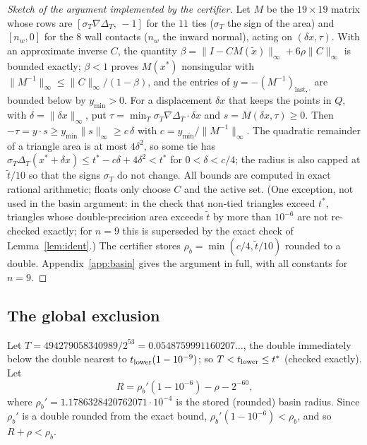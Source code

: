 \documentclass[11pt]{amsart}
\theoremstyle{definition}
\newcommand{\tstar}{t^{*}}
\begin{document}
\begin{proof}[Sketch of the argument implemented by the certifier]
Let $M$ be the $19\times19$ matrix whose rows are $[\sigma_T\nabla\Delta_T,\,-1]$ for the $11$ ties ($\sigma_T$ the sign of the area) and $[n_w, 0]$ for the $8$ wall contacts ($n_w$ the inward normal), acting on $(\delta x, \tau)$. With an approximate inverse $C$, the quantity $\beta = \|I - CM(\tilde x)\|_\infty + 6\rho\|C\|_\infty$ is bounded exactly; $\beta < 1$ proves $M(x^*)$ nonsingular with $\|M^{-1}\|_\infty \le \|C\|_\infty/(1-\beta)$, and the entries of $y = -(M^{-1})_{\text{last},\cdot}$ are bounded below by $y_{\min} > 0$. For a displacement $\delta x$ that keeps the points in $Q$, with $\delta = \|\delta x\|_\infty$, put $\tau = \min_T \sigma_T\nabla\Delta_T\cdot\delta x$ and $s = M(\delta x,\tau) \ge 0$. Then $-\tau = y\cdot s \ge y_{\min}\|s\|_\infty \ge c\,\delta$ with $c = y_{\min}/\|M^{-1}\|_\infty$. The quadratic remainder of a triangle area is at most $4\delta^2$, so some tie has $\sigma_T\Delta_T(x^*+\delta x) \le \tstar - c\delta + 4\delta^2 < \tstar$ for $0 < \delta < c/4$; the radius is also capped at $\tilde t/10$ so that the signs $\sigma_T$ do not change. All bounds are computed in exact rational arithmetic; floats only choose $C$ and the active set. (One exception, not used in the basin argument: in the check that non-tied triangles exceed $\tstar$, triangles whose double-precision area exceeds $\tilde t$ by more than $10^{-6}$ are not re-checked exactly; for $n = 9$ this is superseded by the exact check of Lemma~\ref{lem:ident}.) The certifier stores $\rho_b = \min(c/4, \tilde t/10)$ rounded to a double. Appendix~\ref{app:basin} gives the argument in full, with all constants for $n = 9$. %
\end{proof}

\subsection{The global exclusion}
Let $T = 494279058340989 / 2^{53} = 0.0548759991160207\ldots$, the double immediately below the double nearest to $t_{\rm lower}(1-10^{-9})$; so $T < t_{\rm lower} \le \tstar$ (checked exactly). Let %
\[
  R = \rho_b'(1 - 10^{-6}) - \rho - 2^{-60},
\]
where $\rho_b' = 1.1786328420762071\cdot10^{-4}$ is the stored (rounded) basin radius. Since $\rho_b'$ is a double rounded from the exact bound, $\rho_b'(1-10^{-6}) < \rho_b$, and so $R + \rho < \rho_b$. %
\end{document}
